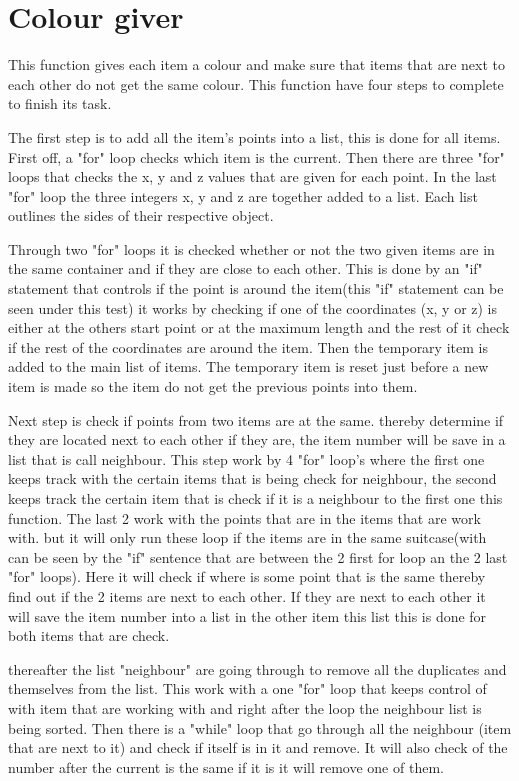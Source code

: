 \section{Colour giver}
This function gives each item a colour and make sure that items that are next to each other do not get the same colour. This function have four steps to complete to finish its task.

The first step is to add all the item's points into a list, this is done for all items. First off, a "for" loop checks which item is the current. Then there are three "for" loops that checks the x, y and z values that are given for each point. In the last "for" loop the three integers x, y and z are together added to a list. Each list outlines the sides of their respective object. 

Through two "for" loops it is checked whether or not the two given items are in the same container and if they are close to each other. This is done by an "if" statement that controls if the point is around the item(this "if" statement can be seen under this test) it works by checking if one of the coordinates (x, y or z) is either at the others start point or at the maximum length and the rest of it check if the rest of the coordinates are around the item. Then the temporary item is added to the main list of items.  The temporary item is reset just before a new item is made so the item do not get the previous points into them.

Next step is check if points from two items are at the same. thereby determine if they are located next to each other if they are, the item number will be save in a list that is call neighbour. This step work by 4 "for" loop's where the first one keeps track with the certain items that is being check for neighbour, the second keeps track  the certain item that is check if it is a neighbour to the first one this function. The last 2 work with the points that are in the items that are work with. but it will only run these loop if the items are in the same suitcase(with can be seen by the "if" sentence that are between the 2 first for loop an the 2 last "for" loops). Here it will check if where is some point that is the same thereby find out if the 2 items are next to each other. If they are next to each other it will save the item number into a list in the other item this list this is done for both items that are check.


thereafter the list "neighbour" are going through to remove all the duplicates and themselves from the list. This work with a one "for" loop that keeps control of with item that are working with and right after the loop the neighbour list is being sorted. Then there is a "while" loop that go through all the neighbour (item that are next to it) and check if itself is in it and remove. It will also check of the number after the current is the same if it is it will remove one of them.


